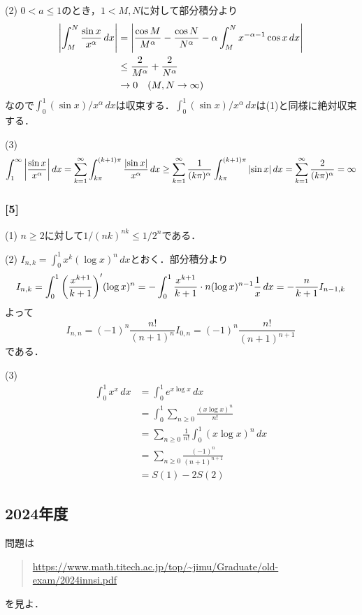 \documentclass[a4j]{ltjsarticle}
\newcommand{\1}{\mathbbm{1}}
\numberwithin{equation}{section}
\theoremstyle{definition}
\begin{document}
(2) $0<a\leq 1$のとき，$1<M,N$に対して部分積分より
\begin{align}
    \abs{\int_M^N \frac{\sin x}{x^\alpha}\,dx}
    &=\abs{\frac{\cos M}{M^\alpha}-\frac{\cos N}{N^\alpha}-\alpha\int_{M}^{N}x^{-\alpha-1}\cos x\,dx}\\
    &\leq \frac{2}{M^\alpha}+\frac{2}{N^\alpha}\\
    &\to 0 \quad (M,N\to\infty)
\end{align}
なので$\int_{0}^1(\sin x)/x^\alpha\,dx$は収束する．$\int_0^1(\sin x)/x^\alpha\,dx$は(1)と同様に絶対収束する．

(3) 
\begin{equation}
    \int_{1}^\infty \abs{\frac{\sin x}{x^\alpha}}\,dx=\sum_{k=1}^\infty \int_{k\pi}^{(k+1)\pi}\frac{\abs{\sin x}}{x^\alpha}\,dx\geq \sum_{k=1}^\infty \frac{1}{(k\pi)^\alpha}\int_{k\pi}^{(k+1)\pi}\abs{\sin x}\,dx=\sum_{k=1}^\infty \frac{2}{(k\pi)^\alpha}=\infty
\end{equation}
\subsubsection*{[5]}
(1) $n\geq 2$に対して$1/(nk)^{nk}\leq 1/2^n$である．

(2) $I_{n,k}=\int_{0}^1 x^k (\log x)^n\,dx$とおく．部分積分より
\begin{equation}
    I_{n,k}=\int_{0}^1\qty(\frac{x^{k+1}}{k+1})'(\log x)^n=-\int_{0}^1\frac{x^{k+1}}{k+1}\cdot n(\log x)^{n-1}\frac{1}{x}\,dx=-\frac{n}{k+1}I_{n-1,k}
\end{equation}
よって 
\begin{equation}
    I_{n,n}=(-1)^n\frac{n!}{(n+1)^n}I_{0,n}=(-1)^n\frac{n!}{(n+1)^{n+1}}
\end{equation}
である．

(3) 
\begin{align}
    \int_{0}^{1}x^{x}\,dx&=\int_0^1 e^{x\log x}\,dx\\
    &=\int_{0}^1 \sum_{n\geq 0}\frac{(x\log x)^n}{n!}\\
    &=\sum_{n\geq0}\frac{1}{n!}\int_{0}^1 (x\log x)^n\,dx\\
    &=\sum_{n\geq 0}\frac{(-1)^n}{(n+1)^{n+1}}\\
    &=S(1)-2S(2)
\end{align}
\subsection{2024年度}
問題は
\begin{quote}
    \url{https://www.math.titech.ac.jp/top/~jimu/Graduate/old-exam/2024innsi.pdf}
\end{quote}
を見よ．
\end{document}
